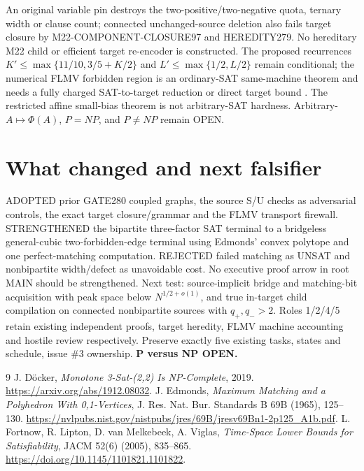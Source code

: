 \documentclass[11pt]{article}
\begin{document}
An original variable pin destroys the two-positive/two-negative quota, ternary width or clause count; connected unchanged-source deletion also fails target closure by M22-COMPONENT-CLOSURE97 and HEREDITY279. No hereditary M22 child or efficient target re-encoder is constructed. The proposed recurrences $K'\le\max\{11/10,3/5+K/2\}$ and $L'\le\max\{1/2,L/2\}$ remain conditional; the numerical FLMV forbidden region is an ordinary-SAT same-machine theorem and needs a fully charged SAT-to-target reduction or direct target bound \cite{flmv}. The restricted affine small-bias theorem is not arbitrary-SAT hardness. Arbitrary-$A\mapsto\Phi(A)$, $P=NP$, and $P\ne NP$ remain OPEN.

\section{What changed and next falsifier}
ADOPTED prior GATE280 coupled graphs, the source S/U checks as adversarial controls, the exact target closure/grammar and the FLMV transport firewall. STRENGTHENED the bipartite three-factor SAT terminal to a bridgeless general-cubic two-forbidden-edge terminal using Edmonds' convex polytope and one perfect-matching computation. REJECTED failed matching as UNSAT and nonbipartite width/defect as unavoidable cost. No executive proof arrow in root MAIN should be strengthened. Next test: source-implicit bridge and matching-bit acquisition with peak space below $N^{1/2+o(1)}$, and true in-target child compilation on connected nonbipartite sources with $q_+,q_->2$. Roles 1/2/4/5 retain existing independent proofs, target heredity, FLMV machine accounting and hostile review respectively. Preserve exactly five existing tasks, states and schedule, issue \#3 ownership. \textbf{P versus NP OPEN.}

\begin{thebibliography}{9}
 J. D\"ocker, \emph{Monotone 3-Sat-(2,2) Is NP-Complete}, 2019. \url{https://arxiv.org/abs/1912.08032}.
 J. Edmonds, \emph{Maximum Matching and a Polyhedron With 0,1-Vertices}, J. Res. Nat. Bur. Standards B 69B (1965), 125--130. \url{https://nvlpubs.nist.gov/nistpubs/jres/69B/jresv69Bn1-2p125_A1b.pdf}.
 L. Fortnow, R. Lipton, D. van Melkebeek, A. Viglas, \emph{Time-Space Lower Bounds for Satisfiability}, JACM 52(6) (2005), 835--865. \url{https://doi.org/10.1145/1101821.1101822}.
\end{thebibliography}
\end{document}
